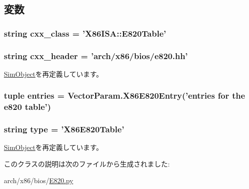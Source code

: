 \subsection{変数}
\hypertarget{classE820_1_1X86E820Table_a58cd55cd4023648e138237cfc0822ae3}{
\subsubsection[{cxx\_\-class}]{\setlength{\rightskip}{0pt plus 5cm}string {\bf cxx\_\-class} = '{\bf X86ISA::E820Table}'}}
\label{classE820_1_1X86E820Table_a58cd55cd4023648e138237cfc0822ae3}
\hypertarget{classE820_1_1X86E820Table_a17da7064bc5c518791f0c891eff05fda}{
\subsubsection[{cxx\_\-header}]{\setlength{\rightskip}{0pt plus 5cm}string {\bf cxx\_\-header} = 'arch/x86/bios/e820.hh'}}
\label{classE820_1_1X86E820Table_a17da7064bc5c518791f0c891eff05fda}


\hyperlink{classm5_1_1SimObject_1_1SimObject_a17da7064bc5c518791f0c891eff05fda}{SimObject}を再定義しています。\hypertarget{classE820_1_1X86E820Table_aa7b3bf5cf82e2cb9b7cea7a35c454576}{
\subsubsection[{entries}]{\setlength{\rightskip}{0pt plus 5cm}tuple {\bf entries} = VectorParam.X86E820Entry('{\bf entries} for the e820 table')}}
\label{classE820_1_1X86E820Table_aa7b3bf5cf82e2cb9b7cea7a35c454576}
\hypertarget{classE820_1_1X86E820Table_acce15679d830831b0bbe8ebc2a60b2ca}{
\subsubsection[{type}]{\setlength{\rightskip}{0pt plus 5cm}string {\bf type} = '{\bf X86E820Table}'}}
\label{classE820_1_1X86E820Table_acce15679d830831b0bbe8ebc2a60b2ca}


\hyperlink{classm5_1_1SimObject_1_1SimObject_acce15679d830831b0bbe8ebc2a60b2ca}{SimObject}を再定義しています。

このクラスの説明は次のファイルから生成されました:\begin{DoxyCompactItemize}
\item 
arch/x86/bios/\hyperlink{E820_8py}{E820.py}\end{DoxyCompactItemize}
